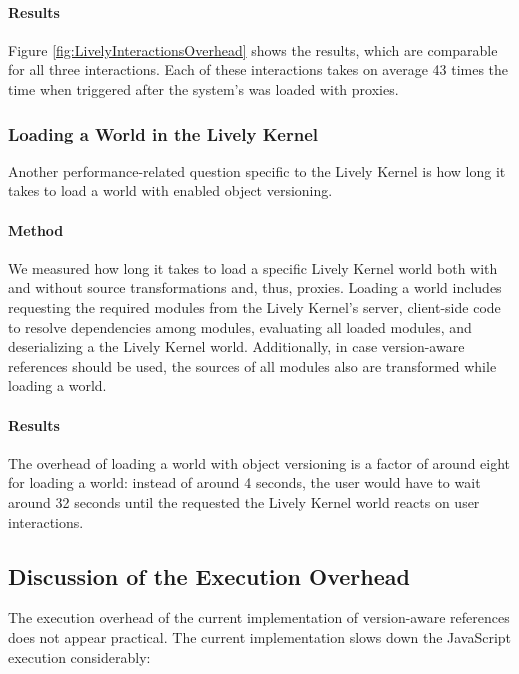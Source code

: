 \paragraph{Results}
Figure \ref{fig:LivelyInteractionsOverhead} shows the results, which are comparable for all three interactions.
Each of these interactions takes on average 43 times the time when triggered after the system's was loaded with proxies.



\subsubsection{Loading a World in the Lively Kernel}

Another performance-related question specific to the Lively Kernel is how long it takes to load a world with enabled object versioning.

\paragraph{Method}
We measured how long it takes to load a specific Lively Kernel world both with and without source transformations and, thus, proxies.
Loading a world includes requesting the required modules from the Lively Kernel's server, client-side code to resolve dependencies among modules, evaluating all loaded modules, and deserializing a the Lively Kernel world.
Additionally, in case version-aware references should be used, the sources of all modules also are transformed while loading a world.

\paragraph{Results}
The overhead of loading a world with object versioning is a factor of around eight for loading a world: instead of around 4 seconds, the user would have to wait around 32 seconds until the requested the Lively Kernel world reacts on user interactions.




\subsection{Discussion of the Execution Overhead}

The execution overhead of the current implementation of version-aware references does not appear practical.
The current implementation slows down the JavaScript execution considerably: 

